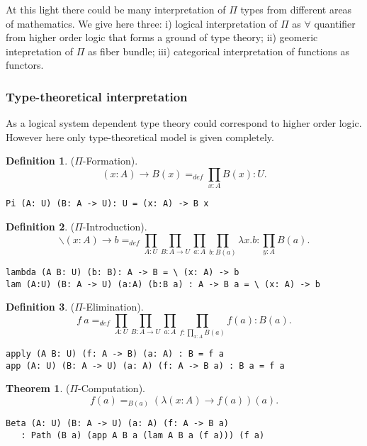 \documentclass[twoside]{article}
\theoremstyle{definition}
\newtheorem{theorem}{Theorem}
\newtheorem{definition}{Definition}
\begin{document}
At this light there could be many interpretation of $\Pi$ types from different
areas of mathematics. We give here three: i) logical interpretation of $\Pi$ as
$\forall$ quantifier from higher order logic
that forms a ground of type theory; ii) geomeric intepretation of $\Pi$ as fiber bundle;
iii) categorical interpretation of functions as functors.

\subsubsection*{Type-theoretical interpretation}

As a logical system dependent type theory could correspond to higher order logic.
However here only type-theoretical model is given completely.

\begin{definition} ($\Pi$-Formation).
$$(x: A) \rightarrow B(x) =_{def} \prod_{x:A}B(x) : U.$$
\begin{lstlisting}
Pi (A: U) (B: A -> U): U = (x: A) -> B x
\end{lstlisting}
\end{definition}

\begin{definition} ($\Pi$-Introduction).
$$\backslash (x: A) \rightarrow b =_{def} \prod_{A:U}\prod_{B:A \rightarrow U}\prod_{a: A}\prod_{b:B(a)}\lambda x.b : \prod_{y:A}B(a).$$
\begin{lstlisting}
lambda (A B: U) (b: B): A -> B = \ (x: A) -> b
lam (A:U) (B: A -> U) (a:A) (b:B a) : A -> B a = \ (x: A) -> b
\end{lstlisting}
\end{definition}

\begin{definition} ($\Pi$-Elimination).
$$f\ a =_{def} \prod_{A:U}\prod_{B: A \rightarrow U}\prod_{a:A}\prod_{f: \prod_{x:A}B(a)}f(a) : B(a).$$
\begin{lstlisting}
apply (A B: U) (f: A -> B) (a: A) : B = f a
app (A: U) (B: A -> U) (a: A) (f: A -> B a) : B a = f a
\end{lstlisting}
\end{definition}

\begin{theorem} ($\Pi$-Computation).
$$f(a) =_{B(a)} (\lambda (x:A) \rightarrow f(a))(a).$$
\begin{lstlisting}
Beta (A: U) (B: A -> U) (a: A) (f: A -> B a)
   : Path (B a) (app A B a (lam A B a (f a))) (f a)
\end{lstlisting}
\end{theorem}
\end{document}
